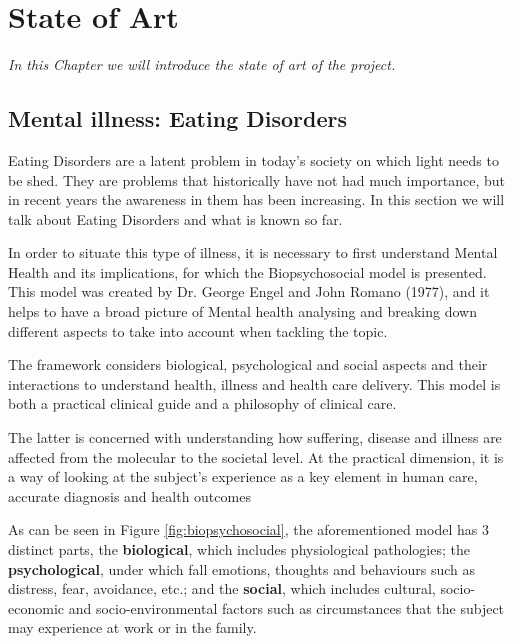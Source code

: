 \chapter{State of Art}
\label{chap:state-of-art}
\textit{In this Chapter we will introduce the state of art of the project.}

\clearpage
\section{Mental illness: Eating Disorders}
Eating Disorders are a latent problem in today's society on which light needs to be shed. They are problems that historically have not had much importance, but in recent years the awareness in them has been increasing. In this section we will talk about Eating Disorders and what is known so far.

In order to situate this type of illness, it is necessary to first understand Mental Health and its implications, for which the Biopsychosocial model is presented. This model was created by Dr. George Engel and John Romano (1977), and it helps to have a broad picture of Mental health analysing and breaking down different aspects to take into account when tackling the topic. 


The framework considers biological, psychological and social aspects and their interactions to understand health, illness and health care delivery. This model is both a practical clinical guide and a philosophy of clinical care. 

The latter is concerned with understanding how suffering, disease and illness are affected from the molecular to the societal level. At the practical dimension, it is a way of looking at the subject's experience as a key element in human care, accurate diagnosis and health outcomes

As can be seen in Figure \ref{fig:biopsychosocial}, the aforementioned model has 3 distinct parts, the \textbf{biological}, which includes physiological pathologies; the \textbf{psychological}, under which fall emotions, thoughts and behaviours such as distress, fear, avoidance, etc.; and the \textbf{social}, which includes cultural, socio-economic and socio-environmental factors such as circumstances that the subject may experience at work or in the family.

